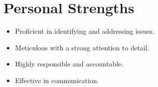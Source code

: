 \documentclass[letterpaper,11pt]{article}
\begin{document}


\section{Personal Strengths}
\begin{itemize}[noitemsep, topsep=0pt, partopsep=0pt]
    \item Proficient in identifying and addressing issues.
    \item Meticulous with a strong attention to detail.
    \item Highly responsible and accountable.
    \item Effective in communication.
\end{itemize}
\end{document}
